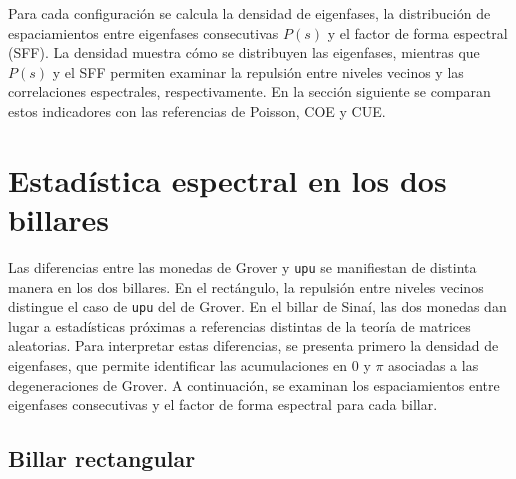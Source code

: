 \documentclass[12pt,a4paper,oneside]{report} %
\begin{document}
Para cada configuración se calcula la densidad de eigenfases, la distribución de espaciamientos entre eigenfases consecutivas $P(s)$ y el factor de forma espectral (SFF). La densidad muestra cómo se distribuyen las eigenfases, mientras que $P(s)$ y el SFF permiten examinar la repulsión entre niveles vecinos y las correlaciones espectrales, respectivamente. En la sección siguiente se comparan estos indicadores con las referencias de Poisson, COE y CUE.

\section{Estadística espectral en los dos billares} %

Las diferencias entre las monedas de Grover y \texttt{upu} se manifiestan de distinta manera en los dos billares. En el rectángulo, la repulsión entre niveles vecinos distingue el caso de \texttt{upu} del de Grover. En el billar de Sinaí, las dos monedas dan lugar a estadísticas próximas a referencias distintas de la teoría de matrices aleatorias. Para interpretar estas diferencias, se presenta primero la densidad de eigenfases, que permite identificar las acumulaciones en $0$ y $\pi$ asociadas a las degeneraciones de Grover. A continuación, se examinan los espaciamientos entre eigenfases consecutivas y el factor de forma espectral para cada billar.

\subsection{Billar rectangular} %
\end{document}
